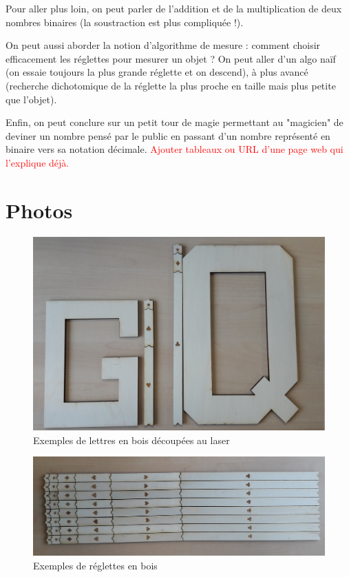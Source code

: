 \documentclass[a4paper,12pt]{scrartcl}
\begin{document}
Pour aller plus loin, on peut parler de l'addition et de la multiplication de deux nombres binaires (la soustraction est plus compliquée !).

On peut aussi aborder la notion d'algorithme de mesure : comment choisir efficacement les réglettes pour mesurer un objet ? On peut aller d'un algo naïf (on essaie toujours la plus grande réglette et on descend), à plus avancé (recherche dichotomique de la réglette la plus proche en taille mais plus petite que l'objet).

Enfin, on peut conclure sur un petit tour de magie permettant au "magicien" de deviner un nombre pensé par le public en passant d'un nombre représenté en binaire vers sa notation décimale.
\textcolor{red}{Ajouter tableaux ou URL d'une page web qui l'explique déjà.}



\newpage
\section{Photos}

\begin{figure}[h]
\begin{center}
\includegraphics[width=0.7\linewidth]{images/lettres_bois.jpg} 
\end{center}
\caption{Exemples de lettres en bois découpées au laser}
\label{fig:lettres}
\end{figure}

\begin{figure}
\begin{center}
\includegraphics[width=0.7\linewidth]{images/reglettes_bois.jpg} 
\end{center}
\caption{Exemples de réglettes en bois}
\label{fig:reglettes}
\end{figure}
\end{document}
